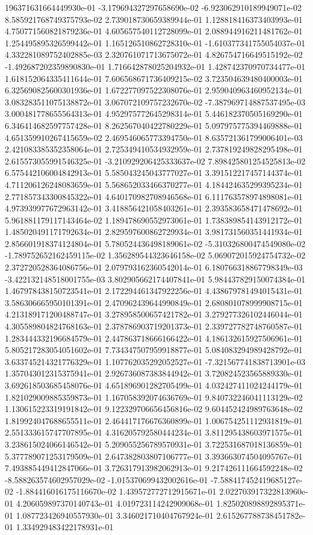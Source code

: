 196371631664449930e-01	-3.179694327297658690e-02	-6.923062910189949071e-02	8.585921768749375793e-02	2.739018730659389944e-01	1.128818416373403993e-01	4.750771560821879236e-01	4.605657540112728099e-01	2.088944916211481762e-01	1.254495895326599442e-01	1.165126510862728310e-01	-1.610377341755054037e-01	4.332281089752402885e-03	2.320761071713675072e-01	4.826754716649515192e-02	-1.492687202359890830e-01	1.716642878025204932e-01	1.428742370970734477e-01	1.618152064335411644e-01	7.606568671736409215e-02	3.723504639480400003e-01	6.325690825600301936e-01	1.672277097522308076e-01	2.959040963460952134e-01	3.083283511075138872e-01	3.067072109757232670e-02	-7.387969714887537495e-03	3.000481778655564313e-01	4.952975772645298314e-01	5.446182370505169290e-01	6.346414682597757428e-01	8.262567040422780229e-01	5.097975775394469888e-01	4.651359910267415659e-02	2.469546065773394750e-01	8.635721361799006401e-03	2.421083385352358064e-01	2.725349410534932959e-01	2.737819249828295498e-01	2.615573055991546325e-01	-3.210929206425333637e-02	7.898425801254525813e-02	6.575442106004842913e-01	5.585043245043777027e-01	3.391512217457144374e-01	4.711206126248083659e-01	5.568652033466370277e-01	4.184424635299395234e-01	2.771857343300845322e-01	4.640170982708946568e-01	6.111763578974898081e-01	4.973939977672963142e-01	3.418856421058403261e-01	2.393583658471478692e-01	5.961881179117143464e-02	1.189478690552973061e-01	1.738389854143912172e-01	1.485020491171792634e-01	2.829597600862729934e-01	3.981731560351441934e-01	2.856601918374124804e-01	5.780524436498189061e-02	-5.310326800474549080e-02	-1.789752652162459115e-02	1.356289544323646158e-02	5.069072015924754732e-02	2.372720528364086756e-01	2.079793162360542014e-01	6.180766318867798349e-03	-3.422132148518001755e-03	3.802905662174407841e-01	5.984437829150074384e-01	1.467978438150723541e-01	2.172294461347922256e-01	4.438679781494015431e-01	3.586306665950101391e-01	2.470962439644990849e-01	2.680801078999908715e-01	4.213189171200488747e-01	3.278958500657421782e-01	3.279277326102446044e-01	4.305589804824768163e-01	2.378786903719201373e-01	2.339727782748760587e-01	1.283444332196684579e-01	2.447863718666166422e-01	4.186132615927506961e-01	5.805217283054051602e-01	7.734347507959918877e-01	5.084083294989428792e-01	3.633745214321776329e-01	1.107762035292052527e-01	-7.321567741838713901e-03	1.357043012315375941e-01	2.926736087383844942e-01	3.720824523565889330e-01	3.692618503685458076e-01	4.651896901282705499e-01	4.032427411024244179e-01	1.821029009885359873e-01	1.167058392074636769e-01	9.840732246041113129e-02	1.130615223319191842e-01	9.122329706656456816e-02	9.604452424989763648e-02	1.819924047688655511e-01	2.464417176676360899e-01	1.006754251112931819e-01	2.551333615747707895e-01	4.316205792580444234e-01	3.811295438603971575e-01	3.238615024066146542e-01	5.209055256789570931e-01	3.722531687018136859e-01	5.377789071253179509e-01	2.647382803807106777e-01	3.393663074504095767e-01	7.493885449412847066e-01	3.726317913982062913e-01	9.217426111664592248e-02	-8.588263574602957029e-02	-1.015370699432002616e-01	-7.588417452419685127e-02	-1.884416016175116670e-02	1.439572772712915671e-01	2.022703917322813960e-01	4.206059897370140743e-01	4.019723114242909068e-01	1.825020898892895371e-01	1.087723426940557930e-01	3.346021710404767924e-01	2.615267788738451782e-01	1.334929483422178931e-01